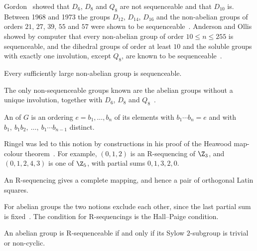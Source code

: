 Gordon~\cite{gor61} showed that $D_6$, $D_8$ and $Q_8$ are not sequenceable and that $D_{10}$ is. Between 1968 and 1973 the groups $D_{12}$, $D_{14}$, $D_{16}$ and the non-abelian groups of orders $21$, $27$, $39$, $55$ and $57$ were shown to be sequenceable~\cite[\S2]{oll25}. Anderson and Ollis showed by computer that every non-abelian group of order $10\leq n\leq255$ is sequenceable, and the dihedral groups of order at least $10$ and the soluble groups with exactly one involution, except $Q_8$, are known to be sequenceable~\cite[\S2.6]{oll25}.

\begin{theorem}\label{thm:mp-sequenceable}
Every sufficiently large non-abelian group is sequenceable.
\end{theorem}

The only non-sequenceable groups known are the abelian groups without a unique involution, together with $D_6$, $D_8$ and $Q_8$~\cite[\S2.6]{oll25}.


\begin{definition}\label{def:r-sequencing}
An  of $G$ is an ordering $e=b_1,\dots,b_n$ of its elements with $b_1\cdots b_n=e$ and with $b_1,\ b_1b_2,\ \dots,\ b_1\cdots b_{n-1}$ distinct.
\end{definition}

Ringel was led to this notion by constructions in his proof of the Heawood map-colour theorem~\cite[\S1]{bfmpy25}. For example, $(0,1,2)$ is an R-sequencing of $\Z_3$, and $(0,1,2,4,3)$ is one of $\Z_5$, with partial sums $0,1,3,2,0$.

\begin{fact}\label{fact:r-complete-mapping}
An R-sequencing gives a complete mapping, and hence a pair of orthogonal Latin squares.
\end{fact}

For abelian groups the two notions exclude each other, since the last partial sum is fixed~\cite[\S3.1]{oll25}. The condition for R-sequencings is the Hall--Paige condition.

\begin{theorem}\label{thm:fgm}
An abelian group is R-sequenceable if and only if its Sylow $2$-subgroup is trivial or non-cyclic.
\end{theorem}

